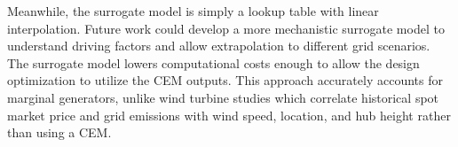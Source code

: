 \documentclass[10pt,twoside]{article}
\begin{document}
Meanwhile, the surrogate model is simply a lookup table with linear interpolation.
Future work could develop a more mechanistic surrogate model to understand driving factors and allow extrapolation to different grid scenarios.
The surrogate model lowers computational costs enough to allow the design optimization to utilize the CEM outputs.
This approach accurately accounts for marginal generators, unlike wind turbine studies \cite{canet_eco-conscious_2023,kainz_how_2024} which correlate historical spot market price and grid emissions with wind speed, location, and hub height rather than using a CEM.
\end{document}
